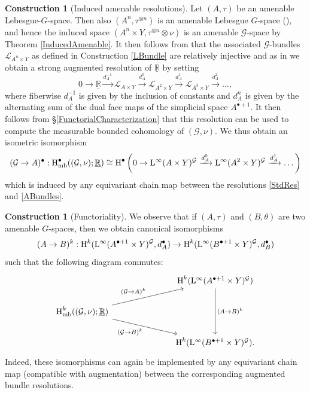 \documentclass[11pt, oneside]{amsart}
\theoremstyle{definition}
\newtheorem{con}[lemma]{Construction}
\theoremstyle{remark}
\theoremstyle{TheoremNum}
\newcommand{\Hm}{\textup{H}}
\newcommand{\Hmb}{\textup{H}_{\textup{mb}}}
\newcommand{\Linf}{\mathrm{L}^{\infty}}
\newcommand{\cG}{\mathcal{G}}
\newcommand{\bR}{\mathbb{R}}
\newcommand{\cL}{\mathcal L}
\begin{document}
\begin{con}[Induced amenable resolutions]\label{SRes}\label{ConAm} Let $(A, \tau)$ be an amenable Lebesgue-$G$-space. Then also  $(A^n, \tau^{\otimes n})$ is an amenable Lebesgue $G$-space (\cite[Example 5.4.1.(ii)]{monod:libro}), and hence the induced space $(A^n \times Y, \tau^{\otimes n} \otimes \nu)$ is an amenable $\cG$-space by Theorem \ref{InducedAmenable}. It then follows from \cite[Proposition~4.8]{sarti:savini25} that the associated $\mathcal{G}$-bundles $\mathcal{L}_{A^n\times Y}$ as defined in Construction \ref{LBundle} are relatively injective and as in \cite[Proposition~4.5]{sarti:savini25} we obtain a strong augmented resolution of $\underline{\bR}$ by setting
\begin{equation}\label{ABundles}
0 \to \underline{\bR} \xrightarrow{d^{-1}_A} \cL_{A \times Y} \xrightarrow{d^0_A} \cL_{A^2 \times Y} \xrightarrow{d^1_A} \cL_{A^3 \times Y} \xrightarrow{d^2_A} \dots,
\end{equation}
where fiberwise $d^{-1}_A$ is given by the inclusion of constants and $d^n_A$ is given by the alternating sum of the dual face maps of the simplicial space $A^{\bullet+1}$. It then follows from \S\ref{FunctorialCharacterization} that this resolution can be used to compute the measurable bounded cohomology of $(\cG, \nu)$. We thus obtain an isometric isomorphism
\begin{equation*}
(\cG \to A)^\bullet: \Hmb^\bullet((\cG, \nu); \underline{\bR}) \cong \Hm^\bullet\left(0 \to \Linf(A \times Y)^{\cG} \xrightarrow{d^0_A} \Linf(A^2 \times Y)^{\cG} \xrightarrow{d^1_A} \dots  \right)
\end{equation*}
which is induced by any equivariant chain map between the resolutions \eqref{StdRes} and \eqref{ABundles}.
\end{con}
\begin{con}[Functoriality]\label{Functoriality1}
We observe that if $(A, \tau)$ and $(B, \theta)$ are two amenable $G$-spaces, then we obtain canonical isomorphisms
\[
(A \to B)^k: \Hm^k(\Linf(A^{\bullet + 1} \times Y)^{\cG}, d_A^\bullet) \to \Hm^k(\Linf(B^{\bullet + 1} \times Y)^{\cG}, d_B^\bullet)
\]
such that the following diagram commutes:
\begin{equation}\label{CommutativeAmenable}
\begin{tikzcd}
 &&&  \Hm^k(\Linf(A^{\bullet+1} \times Y)^{\cG}) \arrow{dd}{(A \to B)^k}\\
\Hmb^k((\cG, \nu);\underline{\bR})\arrow{rrru} {(\cG \to A)^k} \arrow{rrrd}[swap]{(\cG \to B)^k}\\
 &&& \Hm^k(\Linf(B^{\bullet+1} \times Y)^{\cG}).
\end{tikzcd}
\end{equation}
Indeed, these isomorphisms can again be implemented by any equivariant chain map (compatible with augmentation) between the corresponding augmented bundle resolutions.
\end{con}
\end{document}
